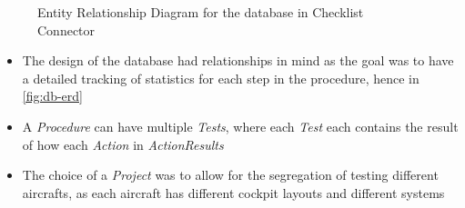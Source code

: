 \documentclass[../dissertation.tex]{subfiles}
\begin{document}
\begin{figure}[!htp]
  \caption[Connector ER Diagram]{Entity Relationship Diagram for the database in Checklist Connector}
  \label{fig:db-erd}
\end{figure}

\begin{itemize} 
  \item The design of the database had relationships in mind as the goal was to
    have a detailed tracking of statistics for each step in the procedure,
    hence in \autoref{fig:db-erd}
  \item A \textit{Procedure} can have multiple \textit{Tests}, where each \textit{Test}
    each contains the result of how each \textit{Action} in \textit{ActionResults}
  \item The choice of a \textit{Project} was to allow for the segregation of testing
    different aircrafts, as each aircraft has different cockpit layouts
    and different systems
\end{itemize}
\end{document}
